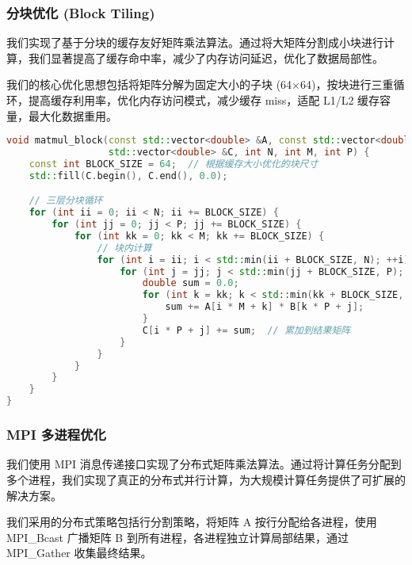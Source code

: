 \documentclass[12pt,a4paper]{article}
\begin{document}
\subsubsection{分块优化 (Block Tiling)}

我们实现了基于分块的缓存友好矩阵乘法算法。通过将大矩阵分割成小块进行计算，我们显著提高了缓存命中率，减少了内存访问延迟，优化了数据局部性。

我们的核心优化思想包括将矩阵分解为固定大小的子块 (64×64)，按块进行三重循环，提高缓存利用率，优化内存访问模式，减少缓存 miss，适配 L1/L2 缓存容量，最大化数据重用。

\begin{lstlisting}[language=c++,caption=分块优化矩阵乘法]
void matmul_block(const std::vector<double> &A, const std::vector<double> &B,
                  std::vector<double> &C, int N, int M, int P) {
    const int BLOCK_SIZE = 64;  // 根据缓存大小优化的块尺寸
    std::fill(C.begin(), C.end(), 0.0);

    // 三层分块循环
    for (int ii = 0; ii < N; ii += BLOCK_SIZE) {
        for (int jj = 0; jj < P; jj += BLOCK_SIZE) {
            for (int kk = 0; kk < M; kk += BLOCK_SIZE) {
                // 块内计算
                for (int i = ii; i < std::min(ii + BLOCK_SIZE, N); ++i) {
                    for (int j = jj; j < std::min(jj + BLOCK_SIZE, P); ++j) {
                        double sum = 0.0;
                        for (int k = kk; k < std::min(kk + BLOCK_SIZE, M); ++k) {
                            sum += A[i * M + k] * B[k * P + j];
                        }
                        C[i * P + j] += sum;  // 累加到结果矩阵
                    }
                }
            }
        }
    }
}
\end{lstlisting}

\subsubsection{MPI 多进程优化}

我们使用 MPI 消息传递接口实现了分布式矩阵乘法算法。通过将计算任务分配到多个进程，我们实现了真正的分布式并行计算，为大规模计算任务提供了可扩展的解决方案。

我们采用的分布式策略包括行分割策略，将矩阵 A 按行分配给各进程，使用 MPI\_Bcast 广播矩阵 B 到所有进程，各进程独立计算局部结果，通过 MPI\_Gather 收集最终结果。
\end{document}

